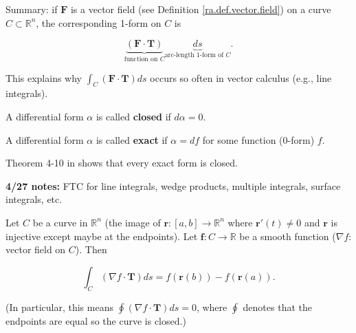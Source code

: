 Summary: if \(\boldsymbol{F}\) is a vector field (see Definition \ref{ra.def.vector.field}) on a curve \(C \subset \mathbb{R}^n\), the corresponding 1-form on \(C\) is 

\[
\underbrace{(\boldsymbol{F} \cdot \boldsymbol{T})}_{\text{function on } C} \underbrace{ds}_{\text{arc-length 1-form of } C}.
\]

This explains why \(\int_C (\boldsymbol{F} \cdot \boldsymbol{T}) ds\) occurs so often in vector calculus (e.g., line integrals).

\begin{definition}\label{ra.def.closed.diff}

A differential form \(\alpha\) is called \textbf{closed} if \(d \alpha = 0\).

\end{definition}

\begin{definition}\label{ra.def.exact.diff}

A differential form \(\alpha\) is called \textbf{exact} if \(\alpha = d f\) for some function (0-form) \(f\).

\end{definition}

\begin{remark}

Theorem 4-10 in \citet{spivak1971calculus} shows that every exact form is closed.

\end{remark}

\textbf{4/27 notes:} FTC for line integrals, wedge products, multiple integrals, surface integrals, etc.

\begin{theorem}

Let \(C\) be a curve in \(\mathbb{R}^n\) (the image of \(\boldsymbol{r}:[a,b] \to \mathbb{R}^n\) where \(\boldsymbol{r}'(t) \neq 0\) and \(\boldsymbol{r}\) is injective except maybe at the endpoints). Let \(\boldsymbol{f}: C \to \mathbb{R}\) be a smooth function (\(\nabla f \): vector field on \(C\)). Then

\[
\int_C (\nabla f \cdot \boldsymbol{T}) ds = f(\boldsymbol{r}(b)) - f(\boldsymbol{r}(a)).
\]

(In particular, this means \(\oint ( \nabla f \cdot \boldsymbol{T}) ds = 0\), where \(\oint\) denotes that the endpoints are equal so the curve is closed.)

\end{theorem}

